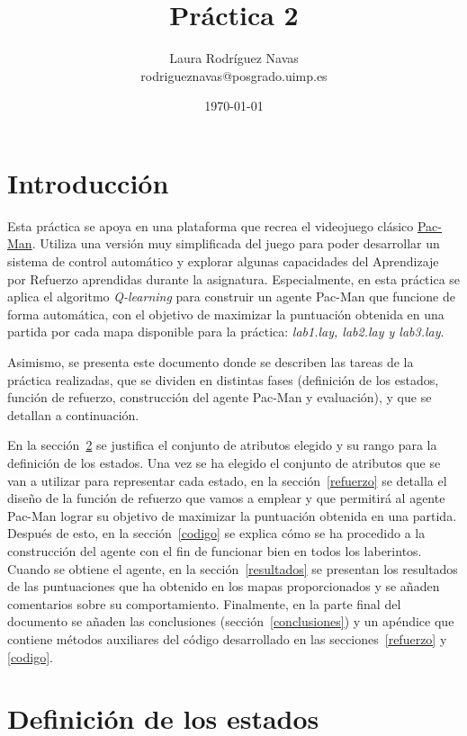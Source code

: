 \documentclass[11pt]{exam}
\title{Práctica 2}
\author{Laura Rodríguez Navas \\ rodrigueznavas@posgrado.uimp.es}
\date{{\selectlanguage{spanish}\today} }
\begin{document}
	
\maketitle

\renewcommand{\tablename}{Tabla}
\renewcommand{\lstlistingname}{Código}

\section{Introducción}\label{introduccion}

Esta práctica se apoya en una plataforma que recrea el videojuego clásico \href{1https://en.wikipedia.org/wiki/Pac-Man}{Pac-Man}. Utiliza una versión muy simplificada del juego para poder desarrollar un sistema de control automático y explorar algunas capacidades del Aprendizaje por Refuerzo aprendidas durante la asignatura. Especialmente, en esta práctica se aplica el algoritmo \textit{Q-learning} para construir un agente Pac-Man que funcione de forma automática, con el objetivo de maximizar la puntuación obtenida en una partida por cada mapa disponible para la práctica: \textit{lab1.lay, lab2.lay y lab3.lay}.  

Asimismo, se presenta este documento donde se describen las tareas de la práctica realizadas, que se dividen en distintas fases (definición de los estados, función de refuerzo, construcción del agente Pac-Man y evaluación), y que se detallan a continuación.

En la sección~\ref{estados} se justifica el conjunto de atributos elegido y su rango para la definición de los estados. Una vez se ha elegido el conjunto de atributos que se van a utilizar para representar cada estado, en la sección~\ref{refuerzo} se detalla el diseño de la función de refuerzo que vamos a emplear y que permitirá al agente Pac-Man lograr su objetivo de maximizar la puntuación obtenida en una partida. Después de esto, en la sección~\ref{codigo} se explica cómo se ha procedido a la construcción del agente con el fin de funcionar bien en todos los laberintos. Cuando se obtiene el agente, en la sección~\ref{resultados} se presentan los resultados de las puntuaciones que ha obtenido en los mapas proporcionados y se añaden comentarios sobre su comportamiento. Finalmente, en la parte final del documento se añaden las conclusiones (sección~\ref{conclusiones}) y un apéndice que contiene métodos auxiliares del código desarrollado en las secciones~\ref{refuerzo} y \ref{codigo}.

\section{Definición de los estados}\label{estados}
\end{document}
